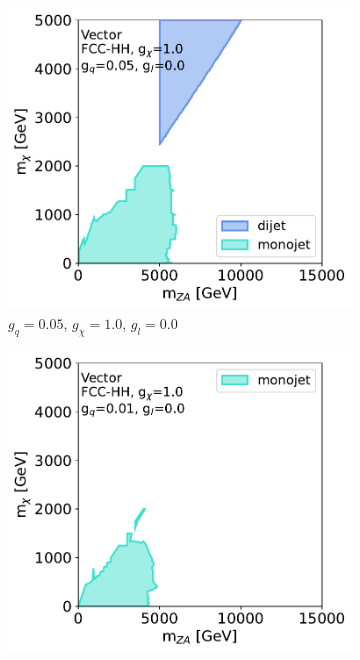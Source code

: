 \documentclass[11pt]{article}
\begin{document}
\begin{figure}
     \begin{subfigure}[b]{0.49\textwidth}
         \centering
         \includegraphics[width=\textwidth]{SummaryPlots-EF10/figures/massmass/fcc-hh/massmass_vector_gq0.05_gdm1.0_gl0.0.pdf}
         \caption{$g_q=0.05$, $g_{\chi}=1.0$, $g_l=0.0$}
         \label{subfig:vector-fcc-v3}
     \end{subfigure}
     \hfill
     \begin{subfigure}[b]{0.49\textwidth}
         \centering
         \includegraphics[width=\textwidth]{SummaryPlots-EF10/figures/massmass/fcc-hh/massmass_vector_gq0.01_gdm1.0_gl0.0.pdf}

\end{subfigure}
\end{figure}
\end{document}
